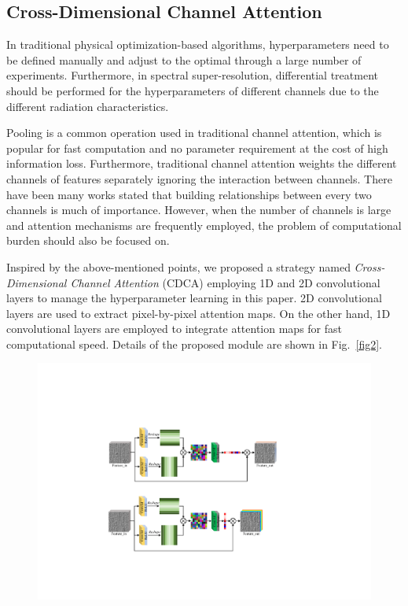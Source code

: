 \documentclass{article}
\begin{document}
\begin{itemize}
\subsection{Cross-Dimensional Channel Attention}
\par{In traditional physical optimization-based algorithms, hyperparameters need to be defined manually and adjust to the optimal through a large number of experiments. Furthermore, in spectral super-resolution, differential treatment should be performed for the hyperparameters of different channels due to the different radiation characteristics.}
\par{Pooling is a common operation used in traditional channel attention, which is popular for fast computation and no parameter requirement at the cost of high information loss. Furthermore, traditional channel attention weights the different channels of features separately ignoring the interaction between channels. There have been many works stated that building relationships between every two channels is much of importance. However, when the number of channels is large and attention mechanisms are frequently employed, the problem of computational burden should also be focused on.}
\par{Inspired by the above-mentioned points, we proposed a strategy named \textit{Cross-Dimensional Channel Attention} (CDCA) employing 1D and 2D convolutional layers to manage the hyperparameter learning in this paper. 2D convolutional layers are used to extract pixel-by-pixel attention maps. On the other hand, 1D convolutional layers are employed to integrate attention maps for fast computational speed. Details of the proposed module are shown in Fig.~\ref{fig2}.}
\begin{figure}[!h]
	\centering
	\includegraphics[width=35em]{CDCA.pdf}

\end{figure}
\end{itemize}
\end{document}
